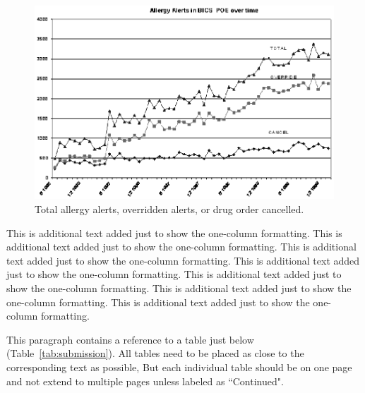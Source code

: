 \documentclass{amia}
\begin{document}
\begin{figure}[H]
  \centering
    \includegraphics[width=1.0\textwidth]{amia_figure1}
 \caption{Total allergy alerts, overridden alerts, or drug order cancelled.}
 \label{fig:amia_figure}
\end{figure}

This is additional text added just to show the one-column formatting. This is additional text added just to show the one-column formatting. This is additional text added just to show the one-column formatting.  This is additional text added just to show the one-column formatting. This is additional text added just to show the one-column formatting. This is additional text added just to show the one-column formatting.  This is additional text added just to show the one-column formatting.

This paragraph contains a reference to a table just below (Table~\ref{tab:submission}).  All tables need to be placed as close to the corresponding text as possible, But each individual table should be on one page and not extend to multiple pages unless labeled as ``Continued".
\end{document}
